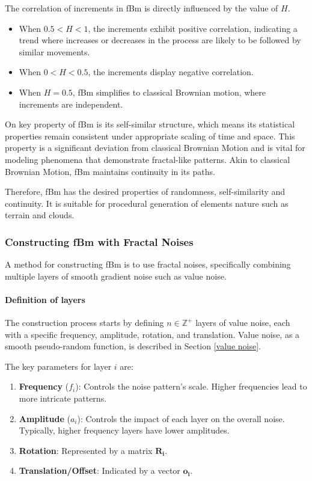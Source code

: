 The correlation of increments in fBm is directly influenced by the value of $H$. 
\begin{itemize}
    \item When $0.5 < H < 1$, the increments exhibit positive correlation, indicating a trend where increases or decreases in the process are likely to be followed by similar movements.
    \item When $0 < H < 0.5$, the increments display negative correlation.
    \item When $H=0.5$, fBm simplifies to classical Brownian motion, where increments are independent.
\end{itemize}

On key property of fBm is its self-similar structure, which means its statistical properties remain consistent under appropriate scaling of time and space. This property is a significant deviation from classical Brownian Motion and is vital for modeling phenomena that demonstrate fractal-like patterns. Akin to classical Brownian Motion, fBm maintains continuity in its paths.

Therefore, fBm has the desired properties of randomness, self-similarity and continuity. It is suitable for procedural generation of elements nature such as terrain and clouds.

\subsubsection{Constructing fBm with Fractal Noises}
\label{construct fbm}


A method for constructing fBm is to use fractal noises, specifically combining multiple layers of smooth gradient noise such as value noise.

\paragraph{Definition of layers}

The construction process starts by defining $n \in \mathbb{Z}^+$ layers of value noise, each with a specific frequency, amplitude, rotation, and translation. Value noise, as a smooth pseudo-random function, is described in Section \ref{value noise}.

The key parameters for layer $i$ are:

\begin{enumerate}
    \item \textbf{Frequency} ($f_i$): Controls the noise pattern's scale. Higher frequencies lead to more intricate patterns.
    \item \textbf{Amplitude} ($a_i$): Controls the impact of each layer on the overall noise. Typically, higher frequency layers have lower amplitudes.
    \item \textbf{Rotation}: Represented by a matrix $\mathbf{R_i}$.
    \item \textbf{Translation/Offset}: Indicated by a vector $\mathbf{o_i}$.
\end{enumerate}

